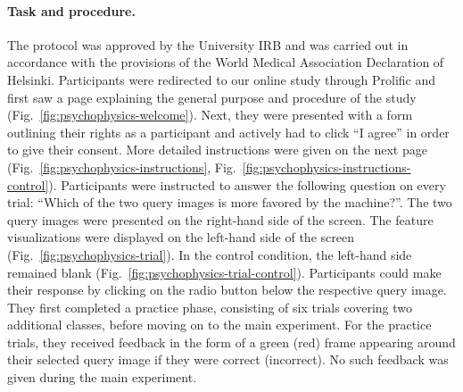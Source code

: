 \paragraph{Task and procedure.} The protocol was approved by the University IRB and was carried out in accordance with the provisions of the World Medical Association Declaration of Helsinki. Participants were redirected to our online study through Prolific and first saw a page explaining the general purpose and procedure of the study (Fig.~\ref{fig:psychophysics-welcome}). Next, they were presented with a form outlining their rights as a participant and actively had to click ``I agree'' in order to give their consent. More detailed instructions were given on the next page (Fig.~\ref{fig:psychophysics-instructions}, Fig.~\ref{fig:psychophysics-instructions-control}). Participants were instructed to answer the following question on every trial: ``Which of the two query images is more favored by the machine?''. The two query images were presented on the right-hand side of the screen. The feature visualizations were displayed on the left-hand side of the screen (Fig.~\ref{fig:psychophysics-trial}). In the control condition, the left-hand side remained blank (Fig.~\ref{fig:psychophysics-trial-control}). Participants could make their response by clicking on the radio button below the respective query image. They first completed a practice phase, consisting of six trials covering two additional classes, before moving on to the main experiment. For the practice trials, they received feedback in the form of a green (red) frame appearing around their selected query image if they were correct (incorrect). No such feedback was given during the main experiment.


